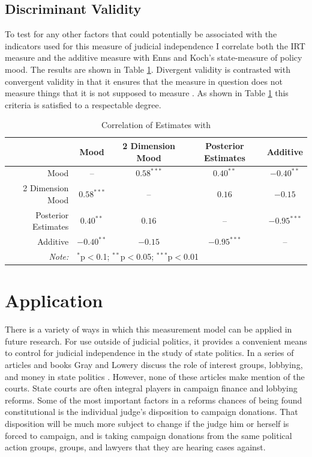 \documentclass[12pt]{article}
\begin{document}
\subsection*{Discriminant Validity}
To test for any other factors that could potentially be associated with the indicators used for this measure of judicial independence I correlate both the IRT measure and the additive measure with Enns and Koch's \citeyearpar{Enns2013} state-measure of policy mood.  The results are shown in Table \ref{EKCor}.  Divergent validity is contrasted with convergent validity in that it ensures that the measure in question does not measure things that it is not supposed to measure \citep{Campbell1959,Jackman2008}.  As shown in Table \ref{EKCor} this criteria is satisfied to a respectable degree.

\begin{table}[ht]
	\centering\caption{Correlation of Estimates with \citet{Enns2013}}\label{EKCor}
	\begin{tabular}{rcccc}
		\hline
		&  Mood &  2 Dimension Mood & Posterior Estimates & Additive \\ 
		\hline
		Mood & -- & $0.58^{***}$ & $0.40^{**}$ & $-0.40^{**}$ \\ 
		2 Dimension Mood &  $0.58^{***}$ & -- & $0.16$ & $-0.15$ \\ 
		Posterior Estimates &  $0.40^{**}$  &  $0.16$  & -- & $-0.95^{***}$ \\ 
		Additive & $-0.40^{**}$  & $-0.15$  & $-0.95^{***}$ & -- \\ 
		\hline
		\textit{Note:}  & \multicolumn{4}{l}{$^{*}$p$<$0.1; $^{**}$p$<$0.05; $^{***}$p$<$0.01} \\
	\end{tabular}
\end{table}

\section{Application}\label{Application}
There is a variety of ways in which this measurement model can be applied in future research.  For use outside of judicial politics, it provides a convenient means to control for judicial independence in the study of state politics.  In a series of articles and books Gray and Lowery discuss the role of interest groups, lobbying, and money in state politics \citep{berkhout2011timing,gray2000population,lowery1995population}.  However, none of these articles make mention of the courts.  State courts are often integral players in campaign finance and lobbying reforms.  Some of the most important factors in a reforms chances of being found constitutional is the individual judge's disposition to campaign donations.  That disposition will be much more subject to change if the judge him or herself is forced to campaign, and is taking campaign donations from the same political action groups, groups, and lawyers that they are hearing cases against.
\end{document}
